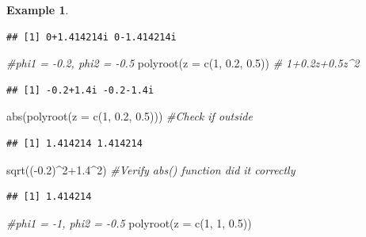 \documentclass[
]{book}
\newenvironment{Shaded}{\begin{snugshade}}{\end{snugshade}}
\newcommand{\AttributeTok}[1]{\textcolor[rgb]{0.77,0.63,0.00}{#1}}
\newcommand{\CommentTok}[1]{\textcolor[rgb]{0.56,0.35,0.01}{\textit{#1}}}
\newcommand{\DecValTok}[1]{\textcolor[rgb]{0.00,0.00,0.81}{#1}}
\newcommand{\FloatTok}[1]{\textcolor[rgb]{0.00,0.00,0.81}{#1}}
\newcommand{\FunctionTok}[1]{\textcolor[rgb]{0.00,0.00,0.00}{#1}}
\newcommand{\NormalTok}[1]{#1}
\newcommand{\SpecialCharTok}[1]{\textcolor[rgb]{0.00,0.00,0.00}{#1}}
\theoremstyle{definition}
\theoremstyle{definition}
\newtheorem{example}{Example}[chapter]
\theoremstyle{definition}
\theoremstyle{definition}
\theoremstyle{remark}
\begin{document}
\begin{example}
\begin{verbatim}
## [1] 0+1.414214i 0-1.414214i
\end{verbatim}

\begin{Shaded}
\begin{Highlighting}[]
\CommentTok{\#phi1 = {-}0.2, phi2 = {-}0.5}
\FunctionTok{polyroot}\NormalTok{(}\AttributeTok{z =} \FunctionTok{c}\NormalTok{(}\DecValTok{1}\NormalTok{, }\FloatTok{0.2}\NormalTok{, }\FloatTok{0.5}\NormalTok{))  }\CommentTok{\# 1+0.2z+0.5z\^{}2}
\end{Highlighting}
\end{Shaded}

\begin{verbatim}
## [1] -0.2+1.4i -0.2-1.4i
\end{verbatim}

\begin{Shaded}
\begin{Highlighting}[]
\FunctionTok{abs}\NormalTok{(}\FunctionTok{polyroot}\NormalTok{(}\AttributeTok{z =} \FunctionTok{c}\NormalTok{(}\DecValTok{1}\NormalTok{, }\FloatTok{0.2}\NormalTok{, }\FloatTok{0.5}\NormalTok{))) }\CommentTok{\#Check if outside }
\end{Highlighting}
\end{Shaded}

\begin{verbatim}
## [1] 1.414214 1.414214
\end{verbatim}

\begin{Shaded}
\begin{Highlighting}[]
\FunctionTok{sqrt}\NormalTok{((}\SpecialCharTok{{-}}\FloatTok{0.2}\NormalTok{)}\SpecialCharTok{\^{}}\DecValTok{2}\FloatTok{+1.4}\SpecialCharTok{\^{}}\DecValTok{2}\NormalTok{) }\CommentTok{\#Verify abs() function did it correctly}
\end{Highlighting}
\end{Shaded}

\begin{verbatim}
## [1] 1.414214
\end{verbatim}

\begin{Shaded}
\begin{Highlighting}[]
\CommentTok{\#phi1 = {-}1, phi2 = {-}0.5}
\FunctionTok{polyroot}\NormalTok{(}\AttributeTok{z =} \FunctionTok{c}\NormalTok{(}\DecValTok{1}\NormalTok{, }\DecValTok{1}\NormalTok{, }\FloatTok{0.5}\NormalTok{))  }
\end{Highlighting}
\end{Shaded}


\end{example}
\end{document}
